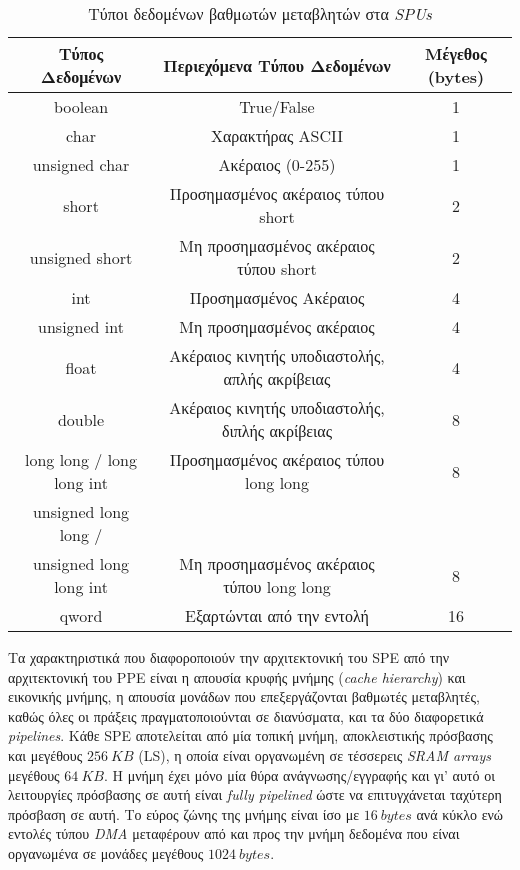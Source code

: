 \begin{table}
\centering
\begin{tabular}{|c|c|c|}
  \hline
  Τύπος Δεδομένων & Περιεχόμενα Τύπου Δεδομένων & Μέγεθος (bytes) \\ \hline
  boolean & True/False & 1 \\ \hline
  char & Χαρακτήρας ASCII & 1 \\ \hline
  unsigned char & Ακέραιος (0-255) & 1 \\ \hline
  short & Προσημασμένος ακέραιος τύπου short & 2 \\ \hline
  unsigned short & Μη προσημασμένος ακέραιος τύπου short & 2 \\ \hline
  int & Προσημασμένος Ακέραιος & 4 \\ \hline
  unsigned int & Μη προσημασμένος ακέραιος & 4 \\ \hline
  float & Ακέραιος κινητής υποδιαστολής, απλής ακρίβειας & 4 \\ \hline
  double & Ακέραιος κινητής υποδιαστολής, διπλής ακρίβειας & 8 \\ \hline
  long long / long long int & Προσημασμένος ακέραιος τύπου long long & 8 \\ \hline
  unsigned long long / & & \\
  unsigned long long int & Μη προσημασμένος ακέραιος τύπου long long & 8 \\ \hline
  qword & Εξαρτώνται από την εντολή & 16 \\
  \hline
\end{tabular}
\caption{Τύποι δεδομένων βαθμωτών μεταβλητών στα \textsl{SPUs}}
\label{table:tab31}
\end{table}
\indent
Τα χαρακτηριστικά που διαφοροποιούν την αρχιτεκτονική του \ac{SPE} από την αρχιτεκτονική του \ac{PPE} είναι η απουσία κρυφής μνήμης (\textsl{cache hierarchy}) και εικονικής μνήμης, η απουσία μονάδων που επεξεργάζονται βαθμωτές μεταβλητές, καθώς όλες οι πράξεις πραγματοποιούνται σε διανύσματα, και τα δύο διαφορετικά \textsl{pipelines}.\newline \indent
Κάθε \ac{SPE} αποτελείται από μία τοπική μνήμη, αποκλειστικής πρόσβασης και μεγέθους \(256\ KB\) (\ac{LS}), η οποία είναι οργανωμένη σε τέσσερεις \textsl{SRAM arrays} μεγέθους \(64\ KB\). Η μνήμη έχει μόνο μία θύρα ανάγνωσης/εγγραφής και γι' αυτό οι λειτουργίες πρόσβασης σε αυτή είναι \textsl{fully pipelined} ώστε να επιτυγχάνεται ταχύτερη πρόσβαση σε αυτή. Το εύρος ζώνης της μνήμης είναι ίσο με \(16\ bytes\) ανά κύκλο ενώ εντολές τύπου \textsl{DMA} μεταφέρουν από και προς την μνήμη δεδομένα που είναι οργανωμένα σε μονάδες μεγέθους \(1024\ bytes\).\newline \indent
